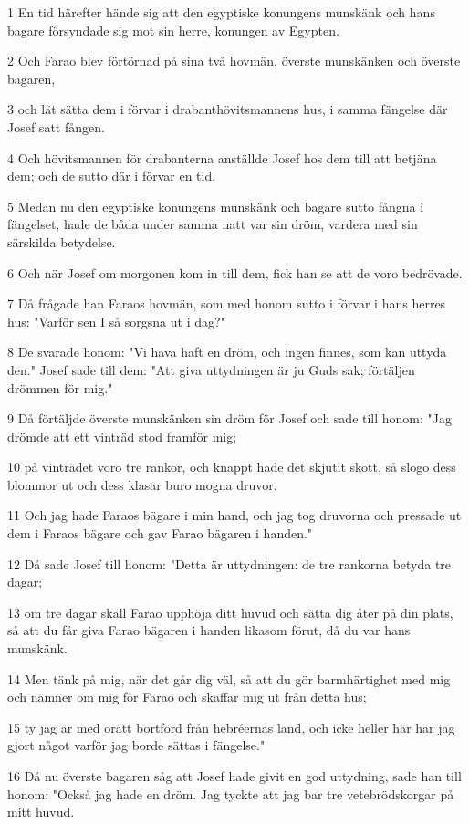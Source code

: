 \par 1 En tid härefter hände sig att den egyptiske konungens munskänk och hans bagare försyndade sig mot sin herre, konungen av Egypten.
\par 2 Och Farao blev förtörnad på sina två hovmän, överste munskänken och överste bagaren,
\par 3 och lät sätta dem i förvar i drabanthövitsmannens hus, i samma fängelse där Josef satt fången.
\par 4 Och hövitsmannen för drabanterna anställde Josef hos dem till att betjäna dem; och de sutto där i förvar en tid.
\par 5 Medan nu den egyptiske konungens munskänk och bagare sutto fångna i fängelset, hade de båda under samma natt var sin dröm, vardera med sin särskilda betydelse.
\par 6 Och när Josef om morgonen kom in till dem, fick han se att de voro bedrövade.
\par 7 Då frågade han Faraos hovmän, som med honom sutto i förvar i hans herres hus: "Varför sen I så sorgsna ut i dag?"
\par 8 De svarade honom: "Vi hava haft en dröm, och ingen finnes, som kan uttyda den." Josef sade till dem: "Att giva uttydningen är ju Guds sak; förtäljen drömmen för mig."
\par 9 Då förtäljde överste munskänken sin dröm för Josef och sade till honom: "Jag drömde att ett vinträd stod framför mig;
\par 10 på vinträdet voro tre rankor, och knappt hade det skjutit skott, så slogo dess blommor ut och dess klasar buro mogna druvor.
\par 11 Och jag hade Faraos bägare i min hand, och jag tog druvorna och pressade ut dem i Faraos bägare och gav Farao bägaren i handen."
\par 12 Då sade Josef till honom: "Detta är uttydningen: de tre rankorna betyda tre dagar;
\par 13 om tre dagar skall Farao upphöja ditt huvud och sätta dig åter på din plats, så att du får giva Farao bägaren i handen likasom förut, då du var hans munskänk.
\par 14 Men tänk på mig, när det går dig väl, så att du gör barmhärtighet med mig och nämner om mig för Farao och skaffar mig ut från detta hus;
\par 15 ty jag är med orätt bortförd från hebréernas land, och icke heller här har jag gjort något varför jag borde sättas i fängelse."
\par 16 Då nu överste bagaren såg att Josef hade givit en god uttydning, sade han till honom: "Också jag hade en dröm. Jag tyckte att jag bar tre vetebrödskorgar på mitt huvud.
